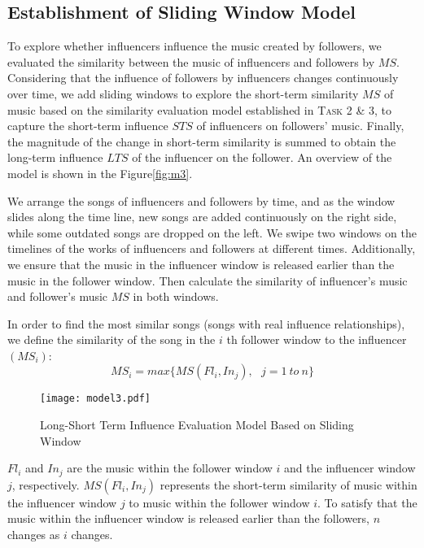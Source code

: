 \documentclass[12pt]{article}  %
\newenvironment{shrinkeq}[1]
{ \bgroup
	\addtolength\abovedisplayshortskip{#1}
	\addtolength\abovedisplayskip{#1}
	\addtolength\belowdisplayshortskip{#1}
	\addtolength\belowdisplayskip{#1}}
{\egroup\ignorespacesafterend}
\begin{document}
\subsection{Establishment of Sliding Window Model}
\vspace{-0.4cm}
To explore whether influencers influence the music created by followers, we evaluated the similarity between the music of influencers and followers by $MS$. Considering that the influence of followers by influencers changes continuously over time, we add sliding windows\cite{9} to explore the short-term similarity $MS$ of music based on the similarity evaluation model established in \textsc{Task} 2 \& 3, to capture the short-term influence $STS$ of influencers on followers' music. Finally, the magnitude of the change in short-term similarity is summed to obtain the long-term influence $LTS$ of the influencer on the follower. An overview of the model is shown in the Figure\eqref{fig:m3}.

We arrange the songs of influencers and followers by time, and as the window slides along the time line, new songs are added continuously on the right side, while some outdated songs are dropped on the left. We swipe two windows on the timelines of the works of influencers and followers at different times. Additionally, we ensure that the music in the influencer window is released earlier than the music in the follower window. Then calculate the similarity of influencer's music and follower's music $MS$ in both windows.

In order to find the most similar songs (songs with real influence relationships), we define the similarity of the song in the $i$ th follower window to the influencer $(MS_i)$:
\begin{shrinkeq}{-1ex}
	\begin{equation}
		MS_i=max\{MS(Fl_i,In_j),\ \ \ j=1\ to\ n\}
	\end{equation}
\end{shrinkeq}

\begin{figure}[htbp]
	\centering
	\texttt{[image: model3.pdf]}
	\caption{Long-Short Term Influence Evaluation Model Based on Sliding Window}\label{fig:m3}
\end{figure}
\vspace{-0.3cm}
$Fl_i$ and $In_j$ are the music within the follower window $i$ and the influencer window $j$, respectively. $MS(Fl_i,In_j)$ represents the short-term similarity of music within the influencer window $j$ to music within the follower window $i$. To satisfy that the music within the influencer window is released earlier than the followers, $n$ changes as $i$ changes.
\end{document}
